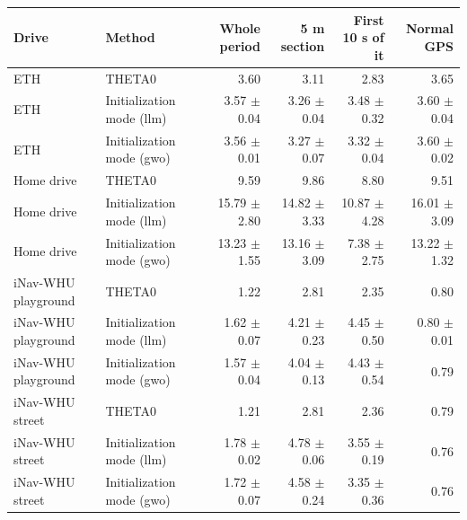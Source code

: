 \begin{tabular}{llrrrr}
\toprule
Drive & Method & Whole period & 5 m section & First 10 s of it & Normal GPS \\
\midrule
ETH & THETA0 & 3.60 & 3.11 & 2.83 & 3.65 \\
ETH & Initialization mode (llm) & 3.57 $\pm$ 0.04 & 3.26 $\pm$ 0.04 & 3.48 $\pm$ 0.32 & 3.60 $\pm$ 0.04 \\
ETH & Initialization mode (gwo) & 3.56 $\pm$ 0.01 & 3.27 $\pm$ 0.07 & 3.32 $\pm$ 0.04 & 3.60 $\pm$ 0.02 \\
Home drive & THETA0 & 9.59 & 9.86 & 8.80 & 9.51 \\
Home drive & Initialization mode (llm) & 15.79 $\pm$ 2.80 & 14.82 $\pm$ 3.33 & 10.87 $\pm$ 4.28 & 16.01 $\pm$ 3.09 \\
Home drive & Initialization mode (gwo) & 13.23 $\pm$ 1.55 & 13.16 $\pm$ 3.09 & 7.38 $\pm$ 2.75 & 13.22 $\pm$ 1.32 \\
iNav-WHU playground & THETA0 & 1.22 & 2.81 & 2.35 & 0.80 \\
iNav-WHU playground & Initialization mode (llm) & 1.62 $\pm$ 0.07 & 4.21 $\pm$ 0.23 & 4.45 $\pm$ 0.50 & 0.80 $\pm$ 0.01 \\
iNav-WHU playground & Initialization mode (gwo) & 1.57 $\pm$ 0.04 & 4.04 $\pm$ 0.13 & 4.43 $\pm$ 0.54 & 0.79 \\
iNav-WHU street & THETA0 & 1.21 & 2.81 & 2.36 & 0.79 \\
iNav-WHU street & Initialization mode (llm) & 1.78 $\pm$ 0.02 & 4.78 $\pm$ 0.06 & 3.55 $\pm$ 0.19 & 0.76 \\
iNav-WHU street & Initialization mode (gwo) & 1.72 $\pm$ 0.07 & 4.58 $\pm$ 0.24 & 3.35 $\pm$ 0.36 & 0.76 \\
\bottomrule
\end{tabular}
